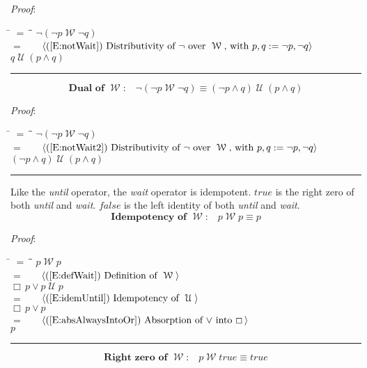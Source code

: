 \documentclass[12pt, fleqn, leqno]{article}
\newcommand{\lgap}{2pt}                             %
\newcommand{\mymathindent}{24pt}                    %
\newcommand{\Until}{\;\mathcal{U}\;}
\newcommand{\Wait}{\;\mathcal{W}\;}
\newcommand{\Always}{\Box\,}
\newcommand{\myqed}{\rule[-.23ex]{1.2ex}{2.0ex}}
\newcommand{\myqedtab}{\hspace{384pt}}              %
\newcommand{\Gll} {\langle}                         %
\newcommand{\Ggg} {\rangle}                         %
\newcommand{\Hint}[1]     {\ \ \ $\Gll              \mbox{#1} \Ggg$ }   %
\begin{document}
\emph{Proof}:
\begin{tabbing}
\hspace{\mymathindent} \= $= \;$ \= \myqedtab \= \kill
\> \> $\neg (\neg p \Wait \neg q)$\\[\lgap]
\> $=$ \> \Hint{(\ref{E:notWait}) Distributivity of $\neg$ over $\Wait$, with $p,q := \neg p, \neg q$} \\[\lgap]
\> \> $q \Until (p \land q)$ \quad \myqed
\end{tabbing}
\begin{equation}\label{E:DualWait2}
\textbf{Dual of $\Wait$:}\quad \neg (\neg p \Wait \neg q) \equiv (\neg p \land q) \Until (p \land q)
\end{equation}

\emph{Proof}:
\begin{tabbing}
\hspace{\mymathindent} \= $= \;$ \= \myqedtab \= \kill
\> \> $\neg (\neg p \Wait \neg q)$\\[\lgap]
\> $=$ \> \Hint{(\ref{E:notWait2}) Distributivity of $\neg$ over $\Wait$, with $p,q := \neg p, \neg q$} \\[\lgap]
\> \> $(\neg p \land q) \Until (p \land q)$ \quad \myqed
\end{tabbing}

Like the \textit{until} operator, the \textit{wait} operator is idempotent.
$true$ is the right zero of both \textit{until} and \textit{wait}.
$false$ is the left identity of both \textit{until} and \textit{wait}.
\begin{equation}\label{E:idempWait}
\textbf{Idempotency of $\Wait$:}\quad p \Wait p \equiv p
\end{equation}

\emph{Proof}:
\begin{tabbing}
\hspace{\mymathindent} \= $= \;$ \= \myqedtab \= \kill
\> \> $p \Wait p$\\[\lgap]
\> $=$ \> \Hint{(\ref{E:defWait}) Definition of $\Wait$} \\[\lgap]
\> \> $\Always p \lor p\Until p$\\[\lgap]
\> $=$ \> \Hint{(\ref{E:idemUntil}) Idempotency of $\Until$} \\[\lgap]
\> \> $\Always p \lor p$\\[\lgap]
\> $=$ \> \Hint{(\ref{E:absAlwaysIntoOr}) Absorption of $\lor$ into $\Always$}\\[\lgap]
\> \> $p$ \quad \myqed
\end{tabbing}
\begin{equation}\label{E:rightZeroWait}
\textbf{Right zero of $\Wait$:}\quad p \Wait true \equiv true
\end{equation}
\end{document}
